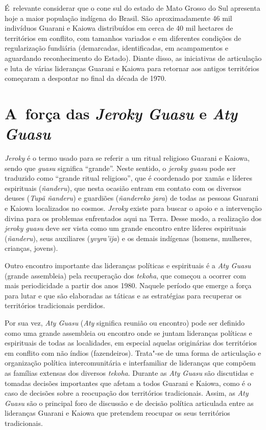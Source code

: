 É~relevante considerar que o cone sul do estado de Mato Grosso do Sul
apresenta hoje a maior população indígena do Brasil. São
aproximadamente 46 mil indivíduos Guarani e Kaiowa distribuídos em
cerca de 40 mil hectares de territórios em conflito, com tamanhos
variados e em diferentes condições de regularização fundiária
(demarcadas, identificadas, em acampamentos e aguardando reconhecimento
do Estado). Diante disso, as iniciativas de articulação e luta de
várias lideranças Guarani e Kaiowa para retornar aos antigos
territórios começaram a despontar no final da década de 1970.

\section{A~força das \emph{Jeroky Guasu} e \emph{Aty Guasu}}

\emph{Jeroky} é o termo usado para se referir a um ritual religioso Guarani e
Kaiowa, sendo que \emph{guasu} significa ``grande''. Neste sentido, o \emph{jeroky
guasu} pode ser traduzido como ``grande ritual religioso'', que é
coordenado por xamãs e líderes espirituais (\emph{ñanderu}), que nesta ocasião
entram em contato com os diversos deuses (\emph{Tupã ñanderu}) e guardiões
(\emph{ñandereko jara}) de todas as pessoas Guarani e Kaiowa localizados no
cosmos. \emph{Jeroky} existe para buscar o apoio e a intervenção divina para
os problemas enfrentados aqui na Terra. Desse modo, a realização dos
\emph{jeroky guasu} deve ser vista como um grande encontro entre líderes
espirituais (\emph{ñanderu}), seus auxiliares (\emph{yvyra’ija}) e os demais
indígenas (homens, mulheres, crianças, jovens). 

Outro encontro importante das lideranças políticas e espirituais é a \emph{Aty
Guasu} (grande assembleia) pela recuperação dos \emph{tekoha}, que começou a
ocorrer com mais periodicidade a partir dos anos 1980. Naquele período
que emerge a força para lutar e que são elaboradas as táticas e as
estratégias para recuperar os territórios tradicionais perdidos.

Por sua vez, \emph{Aty Guasu} (\emph{Aty} significa reunião ou encontro) pode ser
definido como uma grande assembleia ou encontro onde se juntam
lideranças políticas e espirituais de todas as localidades, em especial
aquelas originárias dos territórios em conflito com não índios
(fazendeiros). Trata"-se de uma forma de articulação e organização
política intercomunitária e interfamiliar de lideranças que compõem as
famílias extensas dos diversos \emph{tekoha}. Durante as \emph{Aty Guasu} são
discutidas e tomadas decisões importantes que afetam a todos Guarani e
Kaiowa, como é o caso de decisões sobre a reocupação dos territórios
tradicionais. Assim, as \emph{Aty Guasu} são o principal foro de discussão e
de decisão política articulada entre as lideranças Guarani e Kaiowa que
pretendem reocupar os seus territórios tradicionais. 

